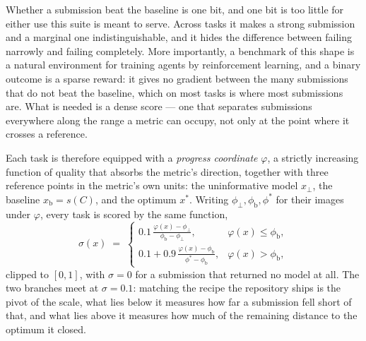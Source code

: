 Whether a submission beat the baseline is one bit, and one bit is too little for either use this
suite is meant to serve. Across tasks it makes a strong submission and a marginal one
indistinguishable, and it hides the difference between failing narrowly and failing completely. More
importantly, a benchmark of this shape is a natural environment for training agents by reinforcement
learning, and a binary outcome is a sparse reward: it gives no gradient between the many submissions
that do not beat the baseline, which on most tasks is where most submissions are. What is needed is a
dense score --- one that separates submissions everywhere along the range a metric can occupy, not
only at the point where it crosses a reference.

Each task is therefore equipped with a \emph{progress coordinate} $\varphi$, a strictly increasing
function of quality that absorbs the metric's direction, together with three reference points in the
metric's own units: the uninformative model $x_{\perp}$, the baseline $x_{\mathrm{b}} = s(C)$, and the
optimum $x^{\ast}$. Writing $\phi_{\perp}, \phi_{\mathrm{b}}, \phi^{\ast}$ for their images under
$\varphi$, every task is scored by the same function,
\begin{equation}
  \label{eq:ladder}
  \sigma(x) \;=\;
  \begin{cases}
    \displaystyle 0.1\,\frac{\varphi(x) - \phi_{\perp}}{\phi_{\mathrm{b}} - \phi_{\perp}},
      & \varphi(x) \le \phi_{\mathrm{b}}, \\[1.1em]
    \displaystyle 0.1 + 0.9\,\frac{\varphi(x) - \phi_{\mathrm{b}}}{\phi^{\ast} - \phi_{\mathrm{b}}},
      & \varphi(x) > \phi_{\mathrm{b}},
  \end{cases}
\end{equation}
clipped to $[0,1]$, with $\sigma = 0$ for a submission that returned no model at all. The two branches
meet at $\sigma = 0.1$: matching the recipe the repository ships is the pivot of the scale, what lies
below it measures how far a submission fell short of that, and what lies above it measures how much
of the remaining distance to the optimum it closed.


